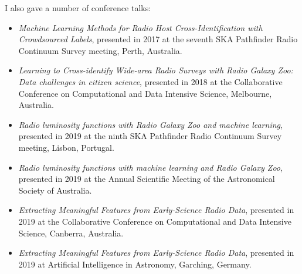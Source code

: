 \newpage

I also gave a number of conference talks:
\begin{itemize}
    \item \emph{Machine Learning Methods for Radio Host Cross-Identification with Crowdsourced Labels}, presented in 2017 at the seventh SKA Pathfinder Radio Continuum Survey meeting, Perth, Australia.
    \item \emph{Learning to Cross-identify Wide-area Radio Surveys with Radio Galaxy Zoo: Data challenges in citizen science}, presented in 2018 at the Collaborative Conference on Computational and Data Intensive Science, Melbourne, Australia.
    \item \emph{Radio luminosity functions with Radio Galaxy Zoo and machine learning}, presented in 2019 at the ninth SKA Pathfinder Radio Continuum Survey meeting, Lisbon, Portugal.
    \item \emph{Radio luminosity functions with machine learning and Radio Galaxy Zoo}, presented in 2019 at the Annual Scientific Meeting of the Astronomical Society of Australia.
    \item \emph{Extracting Meaningful Features from Early-Science Radio Data}, presented in 2019 at the Collaborative Conference on Computational and Data Intensive Science, Canberra, Australia.
    \item \emph{Extracting Meaningful Features from Early-Science Radio Data}, presented in 2019 at Artificial Intelligence in Astronomy, Garching, Germany.
\end{itemize}
